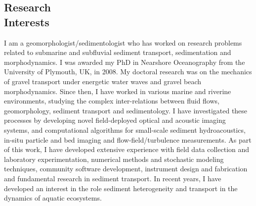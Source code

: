 \documentclass[margin,line]{resume}
\begin{document}
\begin{resume}
\section{\mysidestyle Research\\Interests}
    \begin{footnotesize}
I am a geomorphologist/sedimentologist who has worked on research problems related to
submarine and subfluvial sediment transport, sedimentation and morphodynamics. I was
awarded my PhD in Nearshore Oceanography from the University of Plymouth, UK, in 2008.
My doctoral research was on the mechanics of gravel transport under energetic water waves and
gravel beach morphodynamics. Since then, I have worked in various marine and riverine environments,
studying the complex inter-relations between fluid flows, geomorphology, sediment transport
and sedimentology. I have investigated these processes by developing novel field-deployed
optical and acoustic imaging systems, and computational algorithms for small-scale sediment hydroacoustics, in-situ particle and bed imaging and flow-field/turbulence measurements. As part of this work, I have developed
extensive experience with field data collection and laboratory
experimentation, numerical methods
and stochastic modeling techniques, community software development, instrument design and
fabrication and fundamental research in sediment
transport. In recent years, I have developed an interest in the role sediment heterogeneity and transport in the
dynamics of aquatic ecosystems.
     \end{footnotesize}


\end{resume}
\end{document}
